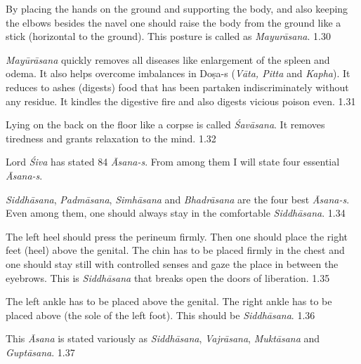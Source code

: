 
By placing the hands on the ground and supporting the body, and also keeping the elbows besides the navel one should raise the body from the ground like a stick (horizontal to the ground). This posture is called as \textit{Mayurāsana}.  1.30

\newpage
{}

\textit{Mayūrāsana} quickly removes all diseases like enlargement of the spleen and odema. It also helps overcome imbalances in Doṣa-s (\textit{Vāta, Pitta} and \textit{Kapha}). It reduces to ashes (digests) food that has been partaken indiscriminately without any residue. It kindles the digestive fire and also digests vicious poison even. 1.31
\medskip


Lying on the back on the floor like a corpse is called \textit{Śavāsana}. It removes tiredness and grants relaxation to the mind. 1.32


Lord \textit{Śiva} has stated 84 \textit{Āsana-s}. From among them I will state four essential \textit{Āsana-s}.


\textit{Siddhāsana}, \textit{Padmāsana}, \textit{Simhāsana} and \textit{Bhadrāsana} are the four best \textit{Āsana-s}. Even among them, one should always stay in the comfortable \textit{Siddhāsana}.  1.34


The left heel should press the perineum firmly. Then one should place the right feet (heel) above the genital.  The chin has to be placed firmly in the chest and one should stay still with controlled senses and gaze the place in between the eyebrows. This is \textit{Siddhāsana} that breaks open the doors of liberation.  1.35


The left ankle has to be placed above the genital. The right ankle has to be placed above (the sole of the left foot). This should be \textit{Siddhāsana}. 1.36


This \textit{Āsana} is stated variously as \textit{Siddhāsana}, \textit{Vajrāsana}, \textit{Muktāsana} and \textit{Guptāsana}. 1.37

